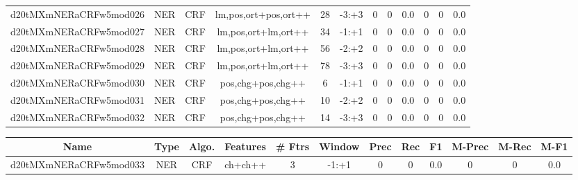 \documentclass[a4paper]{article}
\begin{document}
\begin{landscape}
\begin{center}
\begin{tabular}{ |c|c|c|c|c|c|c|c|c|c|c|c|}
 
 	
 	\small{ d20tMXmNERaCRFw5mod026 } & \small{ NER} & \small{  CRF }  & lm,pos,ort+pos,ort++  &  28 &  \small{  -3:+3 }  &  0 & 0 & 0.0  &  0 & 0 & 0.0 \\
 	

 
 	
 	\small{ d20tMXmNERaCRFw5mod027 } & \small{ NER} & \small{  CRF }  & lm,pos,ort+lm,ort++  &  34 &  \small{  -1:+1 }  &  0 & 0 & 0.0  &  0 & 0 & 0.0 \\
 	

 
 	
 	\small{ d20tMXmNERaCRFw5mod028 } & \small{ NER} & \small{  CRF }  & lm,pos,ort+lm,ort++  &  56 &  \small{  -2:+2 }  &  0 & 0 & 0.0  &  0 & 0 & 0.0 \\
 	

 
 	
 	\small{ d20tMXmNERaCRFw5mod029 } & \small{ NER} & \small{  CRF }  & lm,pos,ort+lm,ort++  &  78 &  \small{  -3:+3 }  &  0 & 0 & 0.0  &  0 & 0 & 0.0 \\
 	

 
 	
 	\small{ d20tMXmNERaCRFw5mod030 } & \small{ NER} & \small{  CRF }  & pos,chg+pos,chg++  &  6 &  \small{  -1:+1 }  &  0 & 0 & 0.0  &  0 & 0 & 0.0 \\
 	

 
 	
 	\small{ d20tMXmNERaCRFw5mod031 } & \small{ NER} & \small{  CRF }  & pos,chg+pos,chg++  &  10 &  \small{  -2:+2 }  &  0 & 0 & 0.0  &  0 & 0 & 0.0 \\
 	

 
 	
 	\small{ d20tMXmNERaCRFw5mod032 } & \small{ NER} & \small{  CRF }  & pos,chg+pos,chg++  &  14 &  \small{  -3:+3 }  &  0 & 0 & 0.0  &  0 & 0 & 0.0 \\
 	
 \hline
\end{tabular}
\end{center}




\begin{center}
\begin{tabular}{ |c|c|c|c|c|c|c|c|c|c|c|c|} 
 \hline
 	Name & Type & Algo. & Features & \# Ftrs & Window & Prec & Rec & F1 & M-Prec & M-Rec & M-F1\\
 \hline

 	

 
 	
 	\small{ d20tMXmNERaCRFw5mod033 } & \small{ NER} & \small{  CRF }  & ch+ch++  &  3 &  \small{  -1:+1 }  &  0 & 0 & 0.0  &  0 & 0 & 0.0 \\
 	


\end{tabular}
\end{center}
\end{landscape}
\end{document}
